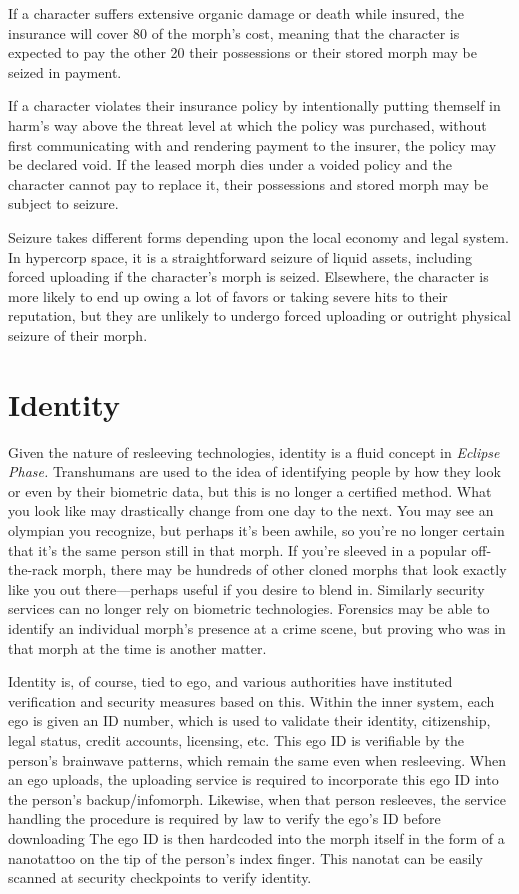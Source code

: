If a character suffers extensive organic damage or 
death while insured, the insurance will cover 80%
of the morph's cost, meaning that the character is 
expected to pay the other 20%
their possessions or their stored morph may be 
seized in payment.

If a character violates their insurance policy by 
intentionally putting themself in harm's way above 
the threat level at which the policy was purchased, 
without first communicating with and rendering payment
to the insurer, the policy may be declared void.
If the leased morph dies under a voided policy and 
the character cannot pay to replace it, their possessions
and stored morph may be subject to seizure.

Seizure takes different forms depending upon the 
local economy and legal system. In hypercorp space, 
it is a straightforward seizure of liquid assets, including
forced uploading if the character's morph is
seized. Elsewhere, the character is more likely to end 
up owing a lot of favors or taking severe hits to their 
reputation, but they are unlikely to undergo forced 
uploading or outright physical seizure of their morph.

\section{Identity}

Given the nature of resleeving technologies, identity 
is a fluid concept in \textit{Eclipse Phase.} Transhumans are 
used to the idea of identifying people by how they 
look or even by their biometric data, but this is no 
longer a certified method. What you look like may 
drastically change from one day to the next. You 
may see an olympian you recognize, but perhaps it's 
been awhile, so you're no longer certain that it's the 
same person still in that morph. If you're sleeved in a 
popular off-the-rack morph, there may be hundreds 
of other cloned morphs that look exactly like you out 
there—perhaps useful if you desire to blend in. Similarly
security services can no longer rely on biometric
technologies. Forensics may be able to identify an individual
morph's presence at a crime scene, but proving
who was in that morph at the time is another matter.

Identity is, of course, tied to ego, and various 
authorities have instituted verification and security 
measures based on this. Within the inner system, each 
ego is given an ID number, which is used to validate 
their identity, citizenship, legal status, credit accounts, 
licensing, etc. This ego ID is verifiable by the person's 
brainwave patterns, which remain the same even 
when resleeving. When an ego uploads, the uploading
service is required to incorporate this ego ID into
the person's backup/infomorph. Likewise, when that 
person resleeves, the service handling the procedure 
is required by law to verify the ego's ID before downloading
The ego ID is then hardcoded into the morph
itself in the form of a nanotattoo on the tip of the person's
index finger. This nanotat can be easily scanned
at security checkpoints to verify identity.

